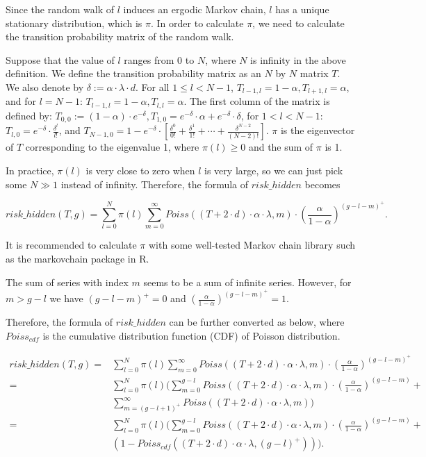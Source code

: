 \documentclass[a4paper,11pt]{article}
\begin{document}
Since the random walk of $l$ induces an ergodic Markov chain, $l$ has a unique
stationary distribution, which is $\pi$. In order to calculate $\pi$, we need to
calculate the transition probability matrix of the random walk.

Suppose that the value of $l$ ranges from 0 to $N$, where $N$ is infinity in the
above definition. We define the transition probability matrix as an $N$ by $N$
matrix $T$. We also denote by $\delta := \alpha \cdot \lambda \cdot d$. For all
$1 \leq l < N - 1$, $T_{l-1,l} = 1 - \alpha, T_{l+1,l} = \alpha$, and for $l = N
- 1$: $T_{l-1,l} = 1 - \alpha, T_{l,l} = \alpha$. The first column of the matrix
is defined by: $T_{0,0} := (1 - \alpha) \cdot e^{-\delta}, T_{1,0} = e^{-\delta}
\cdot \alpha + e^{-\delta} \cdot \delta$, for $1 < l < N - 1$: $T_{l,0} =
e^{-\delta} \cdot \frac{\delta^l}{l!}$, and $T_{N-1,0} = 1 - e^{-\delta} \cdot
\left[\frac{\delta^0}{0!} + \frac{\delta^1}{1!} + \cdots +
\frac{\delta^{N-2}}{(N-2)!}\right]$.  $\pi$ is the eigenvector of $T$
corresponding to the eigenvalue 1, where $\pi(l) \geq 0$ and the sum of $\pi$ is
1.

In practice, $\pi(l)$ is very close to zero when $l$ is very large, so we can
just pick some $N \gg 1$ instead of infinity. Therefore, the formula of
$risk\_hidden$ becomes

$$
risk\_hidden(T,g) = \sum_{l=0}^{N} \pi(l) \sum_{m=0}^{\infty} Poiss((T + 2 \cdot
d) \cdot \alpha \cdot \lambda, m) \cdot \left(\frac{\alpha}{1-\alpha}\right)^{(g
- l - m)^+}.
$$

It is recommended to calculate $\pi$ with some well-tested Markov chain library such
as the markovchain package in R.

The sum of series with index $m$ seems to be a sum of infinite series. However,
for $m > g - l$ we have $(g - l - m)^+ = 0$ and
$\left(\frac{\alpha}{1-\alpha}\right)^{(g - l - m)^+} = 1$.

Therefore, the formula of $risk\_hidden$ can be further converted as below,
where $Poiss_{cdf}$ is the cumulative distribution function (CDF) of Poisson
distribution.

\begin{align*}
risk\_hidden(T,g)
=& \sum_{l=0}^{N}\pi(l)\sum_{m=0}^{\infty}Poiss((T+2 \cdot d) \cdot \alpha \cdot \lambda, m) \cdot (\frac{\alpha}{1-\alpha})^{(g-l-m)^+} \\
=& \sum_{l=0}^{N}\pi(l) (\sum_{m=0}^{g-l}Poiss((T+2 \cdot d) \cdot \alpha
	\cdot \lambda, m) \cdot (\frac{\alpha}{1-\alpha})^{(g-l-m)} + \\
& \sum_{m=(g-l+1)^+}^{\infty}Poiss((T+2 \cdot d) \cdot \alpha \cdot \lambda, m)) \\
=& \sum_{l=0}^{N}\pi(l) ( \sum_{m=0}^{g-l}Poiss((T+2 \cdot d) \cdot
	\alpha \cdot \lambda, m) \cdot (\frac{\alpha}{1-\alpha})^{(g-l-m)} + \\
& (1 - Poiss_{cdf} ((T+2 \cdot d) \cdot \alpha \cdot \lambda, (g-l)^+))).
\end{align*}
\end{document}
